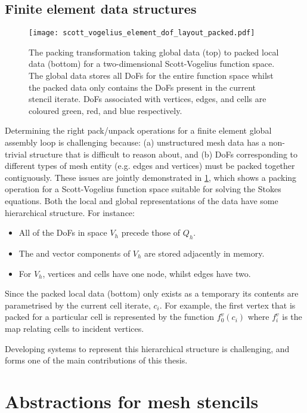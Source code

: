 \documentclass[thesis]{subfiles}
\begin{document}
\subsection{Finite element data structures}

\begin{figure}
  \centering
  \texttt{[image: scott\_vogelius\_element\_dof\_layout\_packed.pdf]}
  \caption{
    The packing transformation taking global data (top) to packed local data (bottom) for a two-dimensional Scott-Vogelius function space.
    The global data stores all DoFs for the entire function space whilst the packed data only contains the DoFs present in the current stencil iterate.
    DoFs associated with vertices, edges, and cells are coloured green, red, and blue respectively.
  }
  \label{fig:scott_vogelius_element_dof_layout_packed}
\end{figure}

Determining the right pack/unpack operations for a finite element global assembly loop is challenging because:
(a) unstructured mesh data has a non-trivial structure that is difficult to reason about, and
(b) DoFs corresponding to different types of mesh entity (e.g. edges and vertices) must be packed together contiguously.
These issues are jointly demonstrated in \cref{fig:scott_vogelius_element_dof_layout_packed}, which shows a packing operation for a Scott-Vogelius function space suitable for solving the Stokes equations.
Both the local and global representations of the data have some hierarchical structure.
For instance:
\begin{itemize}
  \item All of the DoFs in space $V_h$ precede those of $Q_h$.
  \item The  and  vector components of $V_h$ are stored adjacently in memory.
  \item For $V_h$, vertices and cells have one node, whilst edges have two.
\end{itemize}
Since the packed local data (bottom) only exists as a temporary its contents are parametrised by the current cell iterate, $c_i$.
For example, the first vertex that is packed for a particular cell is represented by the function $f^v_0(c_i)$ where $f^v_i$ is the map relating cells to incident vertices.

Developing systems to represent this hierarchical structure is challenging, and forms one of the main contributions of this thesis.

\section{Abstractions for mesh stencils}
\label{sec:introduction_software}
\end{document}
